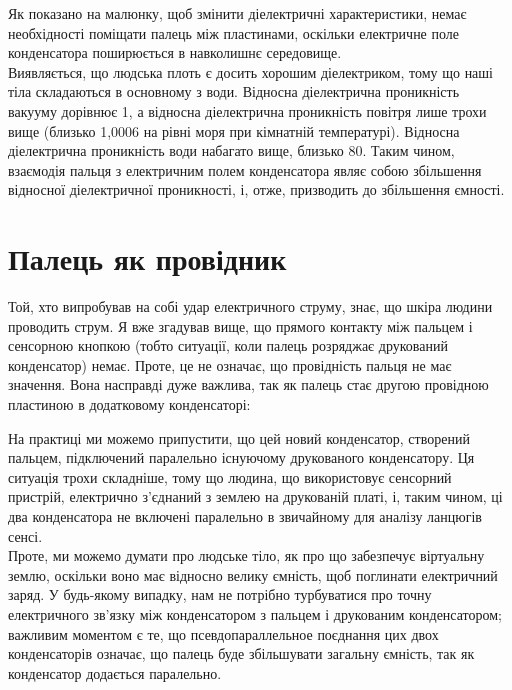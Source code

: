 \documentclass[a4paper,fontsize=12]{report}
\begin{document}
  \begin{figure}[h]
  \end{figure}

  Як показано на малюнку, щоб змінити діелектричні характеристики, немає необхідності поміщати палець між пластинами, оскільки електричне поле конденсатора поширюється в навколишнє середовище.\\

  Виявляється, що людська плоть є досить хорошим діелектриком, тому що наші тіла складаються в основному з води. Відносна діелектрична проникність вакууму дорівнює 1, а відносна діелектрична проникність повітря лише трохи вище (близько 1,0006 на рівні моря при кімнатній температурі). Відносна діелектрична проникність води набагато вище, близько 80. Таким чином, взаємодія пальця з електричним полем конденсатора являє собою збільшення відносної діелектричної проникності, і, отже, призводить до збільшення ємності.
\section{Палець як провідник}
  Той, хто випробував на собі удар електричного струму, знає, що шкіра людини проводить струм. Я вже згадував вище, що прямого контакту між пальцем і сенсорною кнопкою (тобто ситуації, коли палець розряджає друкований конденсатор) немає. Проте, це не означає, що провідність пальця не має значення. Вона насправді дуже важлива, так як палець стає другою провідною пластиною в додатковому конденсаторі:

  \begin{figure}[h]
  \end{figure}

  На практиці ми можемо припустити, що цей новий конденсатор, створений пальцем, підключений паралельно існуючому друкованого конденсатору. Ця ситуація трохи складніше, тому що людина, що використовує сенсорний пристрій, електрично з'єднаний з землею на друкованій платі, і, таким чином, ці два конденсатора не включені паралельно в звичайному для аналізу ланцюгів сенсі.\\

  Проте, ми можемо думати про людське тіло, як про що забезпечує віртуальну землю, оскільки воно має відносно велику ємність, щоб поглинати електричний заряд. У будь-якому випадку, нам не потрібно турбуватися про точну електричного зв'язку між конденсатором з пальцем і друкованим конденсатором; важливим моментом є те, що псевдопараллельное поєднання цих двох конденсаторів означає, що палець буде збільшувати загальну ємність, так як конденсатор додається паралельно.\\
\end{document}
